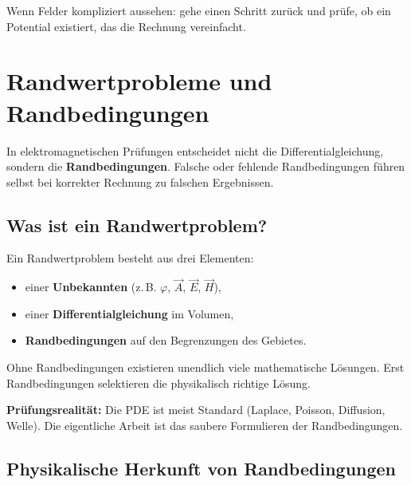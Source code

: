 \documentclass[a4paper]{article}
\newcommand{\imp}[1]{{\color{accent}\bfseries #1}}
\newcommand{\E}{\vec E}
\newcommand{\Hf}{\vec H}
\newcommand{\A}{\vec A}
\begin{document}
\begin{taktik}
Wenn Felder kompliziert aussehen:
gehe einen Schritt zurück und prüfe,
ob ein Potential existiert, das die Rechnung vereinfacht.
\end{taktik}
\section{Randwertprobleme und Randbedingungen}

\begin{merke}
In elektromagnetischen Prüfungen entscheidet nicht die Differentialgleichung,
sondern die \imp{Randbedingungen}.
Falsche oder fehlende Randbedingungen führen selbst bei korrekter Rechnung
zu falschen Ergebnissen.
\end{merke}

\subsection{Was ist ein Randwertproblem?}

Ein Randwertproblem besteht aus drei Elementen:
\begin{itemize}
  \item einer \imp{Unbekannten} (z.\,B. $\varphi$, $\A$, $\E$, $\Hf$),
  \item einer \imp{Differentialgleichung} im Volumen,
  \item \imp{Randbedingungen} auf den Begrenzungen des Gebietes.
\end{itemize}

Ohne Randbedingungen existieren unendlich viele mathematische Lösungen.
Erst Randbedingungen selektieren die physikalisch richtige Lösung.

\begin{schema}
\imp{Prüfungsrealität:}
Die PDE ist meist Standard (Laplace, Poisson, Diffusion, Welle).
Die eigentliche Arbeit ist das saubere Formulieren der Randbedingungen.
\end{schema}

\subsection{Physikalische Herkunft von Randbedingungen}
\end{document}
